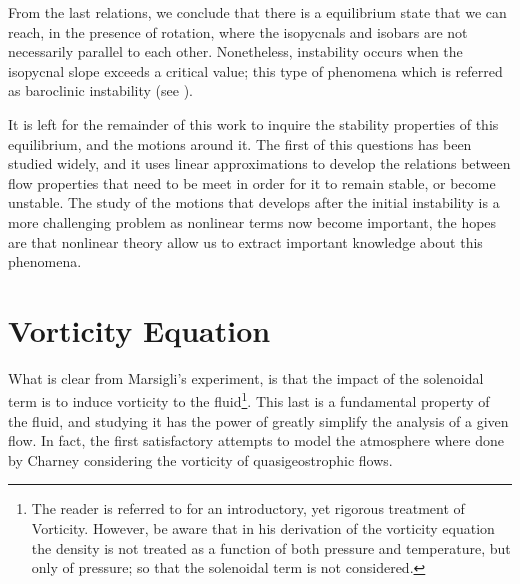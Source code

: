 From the last relations, we conclude that there is a equilibrium state
that we can reach, in the presence of rotation, where the isopycnals and
isobars are not necessarily parallel to each other. Nonetheless,
instability occurs when the isopycnal slope exceeds a critical value;
this type of phenomena which is referred as baroclinic instability (see
).

It is left for the remainder of this work to inquire the stability
properties of this equilibrium, and the motions around it. The first of
this questions has been studied widely, and it uses linear approximations
to develop the relations between flow properties that need to be meet in
order for it to remain stable, or become unstable. The study of the motions that
develops after the initial instability is a more challenging problem as
nonlinear terms now become important, the hopes are that nonlinear theory
allow us to extract important knowledge about this phenomena.

\section{Vorticity Equation}
\label{s:vorticity}

What is clear from Marsigli's experiment, is that the impact of the
solenoidal term is to induce vorticity to the fluid\footnote{The reader
is referred to  for an introductory, yet rigorous
treatment of Vorticity. However, be aware that in his derivation of the
vorticity equation the density is not treated as a function of both
pressure and temperature, but only of pressure; so that the solenoidal
term is not considered.}. This last is a fundamental property of the
fluid, and studying it has the power of greatly simplify the analysis of a
given flow. In fact, the first satisfactory attempts to model the atmosphere
where done by Charney considering the vorticity of quasigeostrophic flows.

